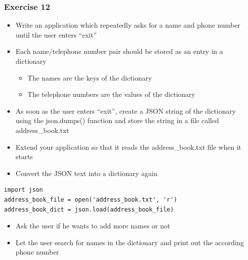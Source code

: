 \documentclass[10pt, a4paper]{beamer} %
\begin{document}
{\begin{frame}\frametitle{Exercise 12}
    
\begin{itemize}
\item Write an application which repeatedly asks for a name and phone
number until the user enters ``exit''
\item Each name/telephone number pair should be stored as an entry in a dictionary
\begin{itemize}
    \item The names are the keys of the dictionary
    \item The telephone numbers are the values of the dictionary
\end{itemize}
\item As soon as the user enters ``exit'', create a JSON string of the dictionary using the json.dumps() function and store the string in a file called address\_book.txt
\end{itemize}

\framebreak

\begin{itemize}
\item Extend your application so that it reads the address\_book.txt file when it starts
\item Convert the JSON text into a dictionary again
\end{itemize}

{
\mdseries
{}
\begin{lstlisting}
import json
address_book_file = open('address_book.txt', 'r')
address_book_dict = json.load(address_book_file)
\end{lstlisting}
}

\begin{itemize}
\item Ask the user if he wants to add more names or not
\item Let the user search for names in the dictionary and print out the according phone number
\end{itemize}

\end{frame}
}
\end{document}
